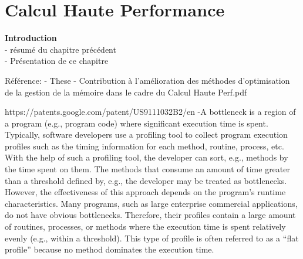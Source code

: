 \chapter{Calcul Haute Performance}\label{chap:hpc}
\minitoc

\textbf{Introduction}\\
- résumé du chapitre précédent\\
- Présentation de ce chapitre\\




\newpage



\newpage



\newpage



\newpage



\newpage





\printbibliography[heading=references,segment=\therefsegment]


Référence:
- These - Contribution à l’amélioration des méthodes d’optimisation de la gestion de la mémoire dans le cadre du Calcul Haute Perf.pdf

 
https://patents.google.com/patent/US9111032B2/en  
    -A bottleneck is a region of a program (e.g., program code) where significant execution time is spent. Typically, software developers use a profiling tool to collect program execution profiles such as the timing information for each method, routine, process, etc. With the help of such a profiling tool, the developer can sort, e.g., methods by the time spent on them. The methods that consume an amount of time greater than a threshold defined by, e.g., the developer may be treated as bottlenecks. However, the effectiveness of this approach depends on the program's runtime characteristics. Many programs, such as large enterprise commercial applications, do not have obvious bottlenecks. Therefore, their profiles contain a large amount of routines, processes, or methods where the execution time is spent relatively evenly (e.g., within a threshold). This type of profile is often referred to as a “flat profile” because no method dominates the execution time.
    